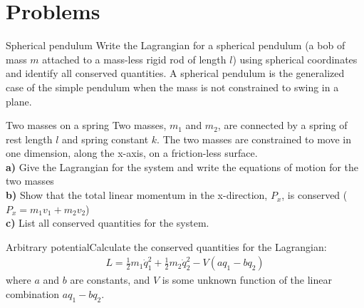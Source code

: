 %
\section{Problems}
\begin{problem}{Spherical pendulum} Write the Lagrangian for a spherical pendulum (a bob of mass $m$ attached to a mass-less rigid rod of length $l$) using spherical coordinates and identify all conserved quantities. A spherical pendulum is the generalized case of the simple pendulum when the mass is not constrained to swing in a plane. 
\label{prob_ConsSym_1}
\end{problem}

\begin{problem}{Two masses on a spring} Two masses, $m_1$ and $m_2$, are connected by a spring of rest length $l$ and spring constant $k$. The two masses are constrained to move in one dimension, along the x-axis, on a friction-less surface.\\
\textbf{a)} Give the Lagrangian for the system and write the equations of motion for the two masses\\
\textbf{b)} Show that the total linear momentum in the x-direction, $P_x$, is conserved ($P_x=m_1v_1+m_2v_2$)\\
\textbf{c)} List all conserved quantities for the system.
\label{prob_ConsSym_2}
\end{problem}

\begin{problem}{Arbitrary potential}Calculate the conserved quantities for the Lagrangian:
\begin{align*}
L=\frac{1}{2}m_1\dot{q}_1^2+\frac{1}{2}m_2\dot{q}_2^2-V(aq_1-bq_2)
\end{align*}
where $a$ and $b$ are constants, and $V$ is some unknown function of the linear combination $aq_1-bq_2$.
\label{prob_ConsSym_3}
\end{problem}

